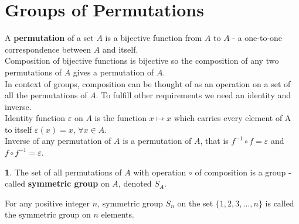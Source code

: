 \documentclass[a4paper,12pt]{article}
\theoremstyle{definition}
\newtheorem{definition}{}[section]
\theoremstyle{axiom}
\theoremstyle{theorem}
\begin{document}
\section{Groups of Permutations}
A \textbf{permutation} of a set $A$ is a bijective function from $A$ to $A$ - a one-to-one correspondence between $A$ and itself. 
\\
Composition of bijective functions is bijective so the composition of any two permutations of $A$ gives a permutation of $A$.
\\
In context of groups, composition can be thought of as an operation on a set of all the permutations of $A$. To fulfill other requirements we need an identity and inverse.
\\
Identity function $\varepsilon$ on $A$ is the function $x \mapsto x$ which carries every element of A to itself $\varepsilon(x) = x$, $\forall x \in A$.
\\
Inverse of any permutation of $A$ is a permutation of $A$, that is $f^{-1} \circ f = \varepsilon$ and $f \circ f^{-1}= \varepsilon$.
\begin{definition}{}
        \textnormal{The set of all permutations of $A$ with operation $\circ$ of composition is a group - called \textbf{symmetric group} on $A$, denoted $S_A$.}
\end{definition}
For any positive integer $n$, symmetric group $S_n$ on the set $\{1, 2, 3, \dots, n\}$ is called the symmetric group on $n$ elements.
\end{document}

